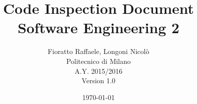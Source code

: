 \begin{figure}
  \centering
	\def\svgwidth{\columnwidth}
    \resizebox{0.35\textwidth}{!}{}
\end{figure}
\title{{\Huge \textbf{C}ode \textbf{I}nspection \textbf{D}ocument}\\{\Large Software Engineering 2}}

\author{Fioratto Raffaele, Longoni Nicol\`{o}
\\Politecnico di Milano
\\{\small A.Y. 2015/2016}
\\{\small Version 1.0}}
\date{\today}
\maketitle
\newpage
\tableofcontents
\listoffigures
\lstlistoflistings